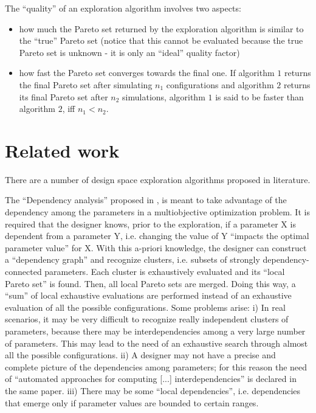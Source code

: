 The ``quality'' of an exploration algorithm involves two aspects:
\begin{itemize}
\item how much the Pareto set returned by the exploration algorithm is similar
to the ``true'' Pareto set (notice that this cannot be evaluated
because the true Pareto set is unknown - it is only an ``ideal''
quality factor)
\item how fast the Pareto set converges towards the final one. If algorithm
$1$ returns the final Pareto set after simulating $n_{1}$ configurations
and algorithm $2$ returns its final Pareto set after $n_{2}$ simulations,
algorithm $1$ is said to be faster than algorithm $2$, iff $n_{1}<n_{2}$.
\end{itemize}

\section{\label{sec:Related-work}Related work}

There are a number of design space exploration algorithms proposed
in literature.

The ``Dependency analysis'' proposed in \cite{givargis_tvlsi02}, is meant
to take advantage of the dependency among the parameters in a multiobjective
optimization problem. It is required that the designer knows, prior
to the exploration, if a parameter X is dependent from a parameter
Y, i.e. changing the value of Y ``impacts the optimal parameter value''
for X. With this a-priori knowledge, the designer can construct a
``dependency graph'' and recognize clusters, i.e. subsets of strongly
dependency-connected parameters. Each cluster is exhaustively evaluated
and its ``local Pareto set'' is found. Then, all local Pareto sets
are merged. Doing this way, a ``sum'' of local exhaustive evaluations
are performed instead of an exhaustive evaluation of all the possible
configurations. Some problems arise: i) In real scenarios, it may
be very difficult to recognize really independent clusters of parameters,
because there may be interdependencies among a very large number of
parameters. This may lead to the need of an exhaustive search through
almost all the possible configurations. ii) A designer may not have
a precise and complete picture of the dependencies among parameters;
for this reason the need of ``automated approaches for computing
{[}...{]} interdependencies'' is declared in the same paper. iii)
There may be some ``local dependencies'', i.e. dependencies that
emerge only if parameter values are bounded to certain ranges.

